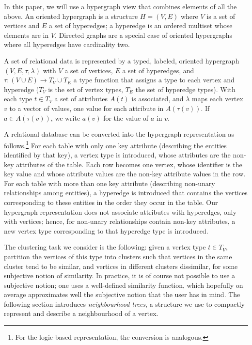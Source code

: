 In this paper, we will use a hypergraph view that combines elements of all the above.
An oriented hypergraph is a structure $H=(V,E)$ where $V$ is a set of vertices and $E$ a set of hyperedges; a hyperedge is an ordered multiset whose elements are in $V$.  
Directed graphs are a special case of oriented hypergraphs where all hyperedges have cardinality two.


A set of relational data is represented by a typed, labeled, oriented hypergraph $(V,E,\tau,\lambda)$ with $V$ a set of vertices, $E$ a set of hyperedges, and $\tau: (V \cup E) \rightarrow T_V \cup T_E$  a type function that assigns a type to each vertex and hyperedge ($T_V$ is the set of vertex types, $T_E$ the set of hyperedge types).  
With each type $t \in T_V$ a set of attributes $A(t)$ is associated, and $\lambda$ maps each vertex $v$ to a vector of values, one value for each attribute in $A(\tau(v))$.  
If $a \in A(\tau(v))$, we write $a(v)$ for the value of $a$ in $v$.


A relational database can be converted into the hypergraph representation as follows.\footnote{For the logic-based representation, the conversion is analogous.}  
For each table with only one key attribute (describing the entities identified by that key), a vertex type is introduced, whose attributes are the non-key attributes of the table.   
Each row becomes one vertex, whose identifier is the key value and whose attribute values are the non-key attribute values in the row.  
For each table with more than one key attribute (describing non-unary relationships among entities), a hyperedge is introduced that contains the vertices corresponding to these entities in the order they occur in the table.  
Our hypergraph representation does not associate attributes with hyperedges, only with vertices; hence, for non-unary relationships contain non-key attributes, a new vertex type corresponding to that hyperedge type is introduced.


The clustering task we consider is the following: given a vertex type $t \in T_V$, partition the vertices of this type into clusters such that vertices in the same cluster tend to be similar, and vertices in different clusters dissimilar, for some subjective notion of similarity.  
In practice, it is of course not possible to use a subjective notion; one uses a well-defined similarity function, which hopefully on average approximates well the subjective notion that the user has in mind. 
The following section introduces \textit{neighbourhood trees}, a structure we use to compactly represent and describe a neighbourhood of a vertex.






